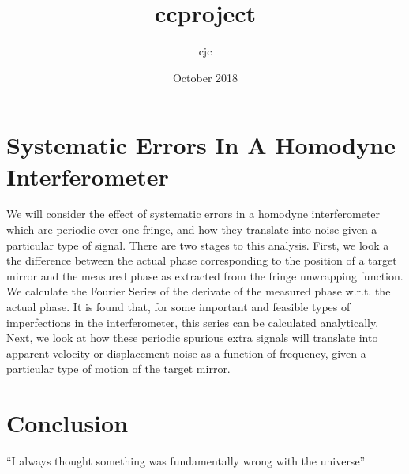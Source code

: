 \documentclass{article}
\title{ccproject}
\author{cjc }
\date{October 2018}
\begin{document}
\maketitle

\section{Systematic Errors In A Homodyne Interferometer}

We will consider the effect of systematic errors in a homodyne interferometer
which are periodic over one fringe, and how they translate into noise
given a particular type of signal. There are two stages to this analysis.
First, we look a the difference between the actual phase corresponding
to the position of a target mirror and the measured phase as extracted
from the fringe unwrapping function. We calculate the Fourier Series
of the derivate of the measured phase w.r.t. the actual phase. It
is found that, for some important and feasible types of imperfections
in the interferometer, this series can be calculated analytically.
Next, we look at how these periodic spurious extra signals will translate
into apparent velocity or displacement noise as a function of frequency,
given a particular type of motion of the target mirror.




\section{Conclusion}
``I always thought something was fundamentally wrong with the universe'' \citep{adams1995hitchhiker}



\end{document}
